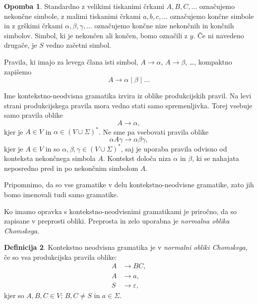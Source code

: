\documentclass{amsart}
\theoremstyle{definition}
\newtheorem{definicija}{Definicija}[section]
\newtheorem{opomba}[definicija]{Opomba}
\theoremstyle{plain} %
\begin{document}
\begin{opomba}

    Standardno z velikimi tiskanimi črkami $ A, B, C, \ldots $ označujemo nekončne simbole,
    z malimi tiskanimi črkami $ a, b, c, \ldots $ označujemo končne simbole in
    z grškimi črkami $ \alpha, \beta, \gamma, \ldots $ označujemo končne nize
    nekončnih in končnih simbolov. Simbol, ki je nekončen ali končen, bomo označili z $y$.
    Če ni navedeno drugače, je $S$ vedno začetni simbol.

    Pravila, ki imajo za levega člana isti simbol, $ A \rightarrow \alpha $, $ A \rightarrow \beta $, \ldots,
    kompaktno zapišemo
    \[
        A \rightarrow \alpha \mid \beta \mid \ldots
    \]
    
    Ime kontekstno-neodvisna gramatika izvira iz oblike produkcijskih pravil. Na levi
    strani produkcijskega pravila mora vedno stati samo spremenljivka. Torej vsebuje samo
    pravila oblike
    \[
        A \rightarrow \alpha,
    \]
    kjer je  $ A \in V $ in $ \alpha \in ( V \cup \Sigma )^* $. Ne sme pa vsebovati
    pravila oblike
    \[
        \alpha A \gamma \rightarrow \alpha\beta\gamma,
    \]
    kjer je $ A \in V $ in so $ \alpha, \beta, \gamma \in ( V \cup \Sigma )^* $, saj je uporaba
    pravila odvisno od konteksta nekončnega simbola $ A $. Kontekst določa niza $ \alpha $ in $ \beta $,
    ki se nahajata neposredno pred in po nekončnim simbolom $ A $.

    Pripomnimo, da so vse gramatike v delu kontekstno-neodvisne gramatike, zato jih bomo imenovali tudi
    samo gramatike.

\end{opomba}

Ko imamo opravka s kontekstno-neodvisnimi gramatikami je priročno, da so zapisane v preprosti
obliki. Preprosta in zelo uporabna je \textit{normalna oblika Chomskega}.

\begin{definicija}

    Kontekstno neodvisna gramatika je v \textit{normalni obliki Chomskega}, če so vsa produkcijska pravila oblike:
    \begin{align*}
        A &\rightarrow BC, \\
        A &\rightarrow a, \\
        S &\rightarrow \varepsilon,
    \end{align*}
    kjer so $ A, B, C \in V $; $ B, C \neq S $ in $ a \in \Sigma $.

\end{definicija}
\end{document}
